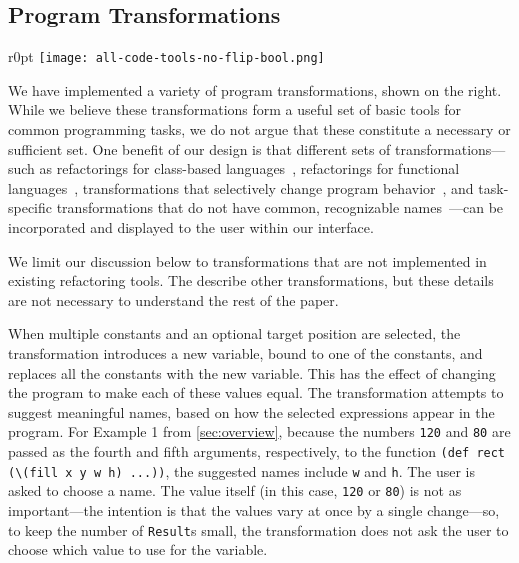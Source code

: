 \subsection{Program Transformations}
\label{sec:little-transformations}


\begin{wrapfigure}{r}{0pt}
\texttt{[image: all-code-tools-no-flip-bool.png]}
\end{wrapfigure}
We have implemented a variety of program transformations, shown on the right.
While we believe these transformations form a
useful set of basic tools for common programming tasks, we
do not argue that these constitute a necessary or sufficient set.
One benefit of our design is that different sets of
transformations---such as
refactorings for class-based languages~\citep{Fowler1999},
refactorings for functional languages~\citep{Thompson2013},
transformations that selectively change program behavior~\citep{Reichenbach:2009}, and
task-specific transformations that do not have common, recognizable
names~\citep{Steimann:2012}---can be incorporated and
displayed to the user within our interface.

We limit our discussion below to transformations that
are not implemented in existing refactoring tools.
The \suppMaterials{} %
describe
other transformations, but these details are not necessary to understand the rest of the
paper.


When multiple constants and an optional target position are selected,
the  transformation introduces a new
variable, bound to one of the constants, and replaces all the
constants with the new variable. This has the effect of changing the
program to make each of these values equal.
The transformation attempts to suggest meaningful names, based on how the
selected expressions appear in the program.
For Example 1 from \autoref{sec:overview}, because the numbers \verb+120+ and
\verb+80+ are passed as the fourth and fifth arguments, respectively, to the
function \verb+(def rect (\(fill x y w h) ...))+, the suggested names include
\verb+w+ and \verb+h+.
The user is asked to choose a name.
%
The value itself (in this case, \verb+120+ or \verb+80+) is not as
important---the intention is that the values vary at once by a single
change---so, to keep the number of \verb+Result+s small,
the transformation does not ask the user to choose
which value to use for the variable.


